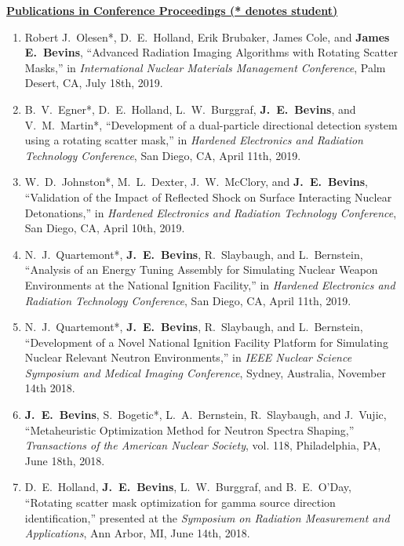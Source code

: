 
\underline{\textbf{Publications in Conference Proceedings (* denotes student)}}

\begin{enumerate}
  \item Robert J.\ Olesen*, D.\ E.\ Holland, Erik Brubaker, James Cole, and \textbf{James E.\ Bevins}, ``Advanced Radiation Imaging Algorithms with Rotating Scatter Masks,” in \textit{International Nuclear Materials Management Conference}, Palm Desert, CA, July 18th, 2019.

  \item B.\ V.\ Egner*, D.\ E.\ Holland, L.\ W.\ Burggraf, \textbf{J.\ E.\ Bevins}, and V.\ M.\ Martin*, ``Development of a dual-particle directional detection system using a rotating scatter mask,” in \textit{Hardened Electronics and Radiation Technology Conference}, San Diego, CA, April 11th, 2019.

  \item W.\ D.\ Johnston*, M.\ L.\ Dexter, J.\ W.\ McClory, and \textbf{J.\ E.\ Bevins}, ``Validation of the Impact of Reflected Shock on Surface Interacting Nuclear Detonations,” in \textit{Hardened Electronics and Radiation Technology Conference}, San Diego, CA, April 10th, 2019.

  \item N.\ J.\ Quartemont*, \textbf{J.\ E.\ Bevins}, R.\ Slaybaugh, and L.\ Bernstein, ``Analysis of an Energy Tuning Assembly for Simulating Nuclear Weapon Environments at the National Ignition Facility,” in \textit{Hardened Electronics and Radiation Technology Conference}, San Diego, CA, April 11th, 2019.

  \item N.\ J.\ Quartemont*, \textbf{J.\ E.\ Bevins}, R.\ Slaybaugh, and L.\ Bernstein, ``Development of a Novel National Ignition Facility Platform for Simulating Nuclear Relevant Neutron Environments,” in \textit{IEEE Nuclear Science Symposium and Medical Imaging Conference}, Sydney, Australia, November 14th 2018.

  \item \textbf{J.\ E.\ Bevins}, S.\ Bogetic*, L.\ A.\ Bernstein, R.\ Slaybaugh, and J.\ Vujic, ``Metaheuristic Optimization Method for Neutron Spectra Shaping,” \textit{Transactions of the American Nuclear Society}, vol. 118, Philadelphia, PA, June 18th, 2018.
  
  \item D.\ E.\ Holland, \textbf{J.\ E.\ Bevins}, L.\ W.\ Burggraf, and B.\ E.\ O’Day, ``Rotating scatter mask optimization for gamma source direction identification,” presented at the \textit{Symposium on Radiation Measurement and Applications}, Ann Arbor, MI, June 14th, 2018.


\end{enumerate}

